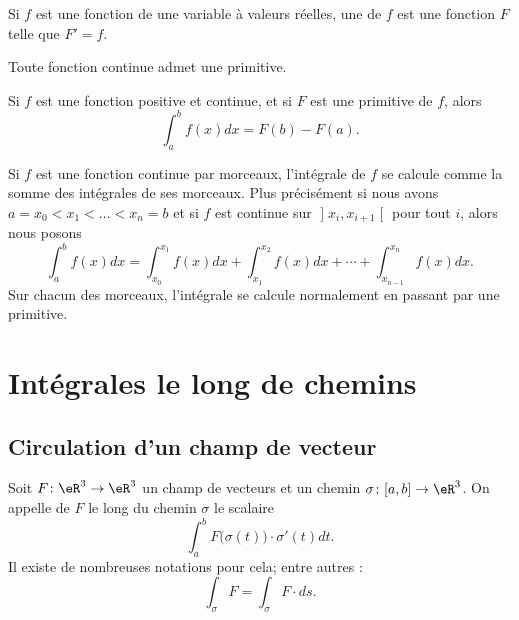\begin{definition}
	Si \( f\) est une fonction de une variable à valeurs réelles, une  de \( f\) est une fonction \( F\) telle que \( F'=f\).
\end{definition}

Toute fonction continue admet une primitive.

\begin{theorem}
	Si \( f\) est une fonction positive et continue, et si \( F\) est une primitive de \( f\), alors
	\begin{equation}
		\int_a^bf(x)dx=F(b)-F(a).
	\end{equation}
\end{theorem}

\begin{remark}
	Si \( f\) est une fonction continue par morceaux, l'intégrale de \( f\) se calcule comme la somme des intégrales de ses morceaux. Plus précisément si nous avons \( a=x_0<x_1<\ldots<x_n=b\) et si \( f\) est continue sur \( \mathopen] x_i , x_{i+1} \mathclose[\) pour tout \( i\), alors nous posons
	\begin{equation}
		\int_a^bf(x)dx=\int_{x_0}^{x_1}f(x)dx+\int_{x_1}^{x_2}f(x)dx+\cdots+\int_{x_{n-1}}^{x_n}f(x)dx.
	\end{equation}
	Sur chacun des morceaux, l'intégrale se calcule normalement en passant par une primitive.
\end{remark}

\section{Intégrales le long de chemins}

\subsection{Circulation d'un champ de vecteur}

\begin{definition}
	Soit \( F\colon \eR^3\to \eR^3\) un champ de vecteurs et un chemin \( \sigma\colon \mathopen[ a , b \mathclose]\to \eR^3\). On appelle  de \( F\) le long du chemin \( \sigma\) le scalaire
	\begin{equation}        \label{EqDeffvkZwh}
		\int_a^b F\big( \sigma(t) \big)\cdot \sigma'(t)dt.
	\end{equation}
	Il existe de nombreuses notations pour cela; entre autres :
	\begin{equation}
		\int_{\sigma}F=\int_{\sigma} F\cdot ds.
	\end{equation}
\end{definition}

